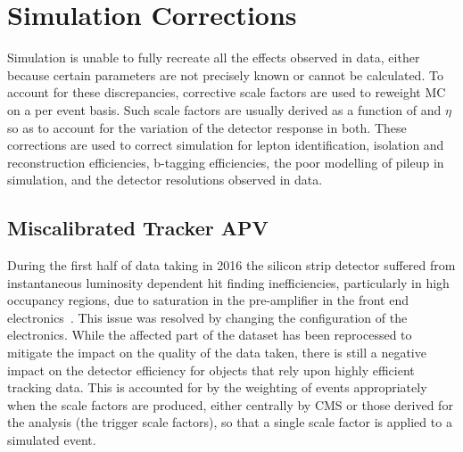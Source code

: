 %
%
\section{Simulation Corrections}\label{sec:simCorrections}
Simulation is unable to fully recreate all the effects observed in data, either because certain parameters are not precisely known or cannot be calculated.
To account for these discrepancies, corrective scale factors are used to reweight MC on a per event basis.
Such scale factors are usually derived as a function of \pt and $\eta$ so as to account for the variation of the detector response in both.
These corrections are used to correct simulation for lepton identification, isolation and reconstruction efficiencies, b-tagging efficiencies, the poor modelling of pileup in simulation, and the detector resolutions observed in data.

\subsection{Miscalibrated Tracker APV}\label{subsec:hipEffect}
During the first half of data taking in 2016 the silicon strip detector suffered from instantaneous luminosity dependent  hit finding inefficiencies, particularly in high occupancy regions, due to saturation in the pre-amplifier in the front end electronics~\cite{Fiori:2016ebh}.
This issue was resolved by changing the configuration of the electronics.
While the affected part of the dataset has been reprocessed to mitigate the impact on the quality of the data taken, there is still a negative impact on the detector efficiency for objects that rely upon highly efficient tracking data.
This is accounted for by the weighting of events appropriately when the scale factors are produced, either centrally by CMS or those derived for the analysis (\ie the trigger scale factors), so that a single scale factor is applied to a simulated event.

